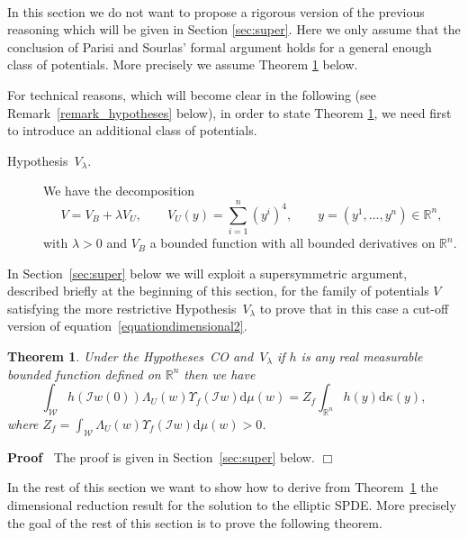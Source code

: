 \documentclass[a4paper,10pt]{article}
\newcommand{\mathd}{\mathrm{d}}
\newenvironment{proof}{\noindent\textbf{Proof\ }}{\hspace*{\fill}$\Box$\medskip}
\newtheorem{theorem}{Theorem}
\newcommand{\descriptionparagraphs}[1]{\begin{description}#1\end{description}}
\begin{document}
\

In this section we do not want to propose a rigorous version of the previous
reasoning which will be given in Section \ref{sec:super}. Here we only assume
that the conclusion of Parisi and Sourlas' formal argument holds for a general
enough class of potentials. More precisely we assume Theorem
\ref{theorem_main1} below.

For technical reasons, which will become clear in the following (see
Remark~\ref{remark_hypotheses} below), in order to state Theorem
\ref{theorem_main1}, we need first to introduce an additional class of
potentials.

{\descriptionparagraphs{\item[Hypothesis~$V_{\lambda}$.] We have the
decomposition
\[ V = V_B + \lambda V_U, \qquad V_U (y) = \sum_{i = 1}^n (y^i)^4, \qquad y =
   (y^1, \ldots, y^n) \in \mathbb{R}^n, \]
with $\lambda > 0$ and $V_B$ a bounded function with all bounded derivatives
on $\mathbb{R}^n$. }}

In Section~\ref{sec:super} below we will exploit a supersymmetric argument,
described briefly at the beginning of this section, for the family of
potentials $V$ satisfying the more restrictive Hypothesis~$V_{\lambda}$ to
prove that in this case a cut-off version of
equation~{\eqref{equationdimensional2}}.

\begin{theorem}
  \label{theorem_main1}Under the Hypotheses~CO and~$V_{\lambda}$ if $h$ is any
  real measurable bounded function defined on $\mathbb{R}^n$ then we have
  \[ \int_{\mathcal{W}} h (\mathcal{I}w (0)) \Lambda_U (w) \Upsilon_f
     (\mathcal{I}w) \mathd \mu (w) = Z_f \int_{\mathbb{R}^n} h (y) \mathd
     \kappa (y), \]
  where $Z_f = \int_{\mathcal{W}} \Lambda_U (w) \Upsilon_f (\mathcal{I}w)
  \mathd \mu (w) > 0$.
\end{theorem}

\begin{proof}
  The proof is given in Section~\ref{sec:super} below.
\end{proof}

In the rest of this section we want to show how to derive from
Theorem~\ref{theorem_main1} the dimensional reduction result for the solution
to the elliptic SPDE. More precisely the goal of the rest of this section is
to prove the following theorem.
\end{document}
